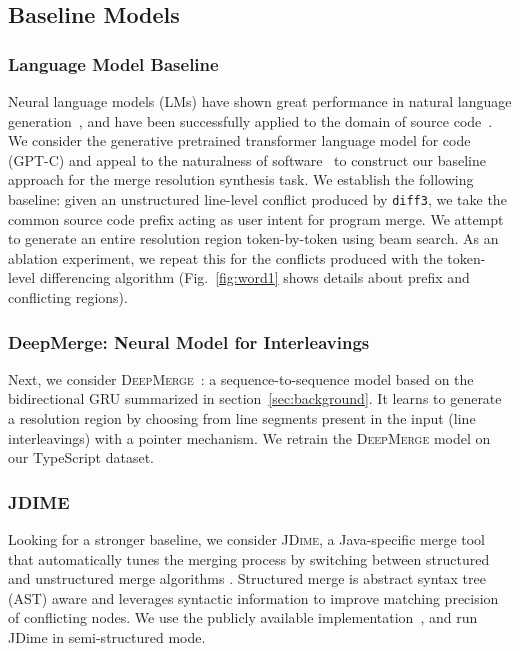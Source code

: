 \subsection{Baseline Models}
\label{sec:baselines}

\subsubsection{Language Model Baseline}

Neural language models (LMs) have shown great performance in natural language generation~\citep{gpt2, sellam-etal-2020-bleurt}, and have been successfully applied to the domain of source code~\citep{10.5555/2337223.2337322, gptc, feng-etal-2020-codebert}. We consider the generative pretrained transformer language model for code (GPT-C) and appeal to the naturalness of software~\citep{naturalness} to construct our baseline approach for the merge resolution synthesis task. We establish the following baseline:
given an unstructured line-level conflict produced by \texttt{diff3}, we take the common source code prefix acting as user intent for program merge. We attempt to generate an entire resolution region token-by-token using beam search. As an ablation experiment, we repeat this for the conflicts produced with the token-level differencing algorithm (Fig.~\ref{fig:word1} shows details about prefix and conflicting regions).

\subsubsection{DeepMerge: Neural Model for Interleavings}

Next, we consider \textsc{DeepMerge}~\citep{Dinella2021}: a sequence-to-sequence model based on the bidirectional GRU summarized in section~\ref{sec:background}. It learns to generate a resolution region by choosing from line segments present in the input (line interleavings) with a pointer mechanism. We retrain the \textsc{DeepMerge} model on our TypeScript dataset.

\subsubsection{JDIME}
Looking for a stronger baseline, we consider \textsc{JDime}, a Java-specific merge tool that automatically tunes the merging process by switching between structured and unstructured merge algorithms \citep{apel2012structured}. Structured merge is abstract syntax tree (AST) aware and leverages syntactic information to improve matching precision of conflicting nodes.  We use the publicly available implementation~\citep{jdime}, and run JDime in semi-structured mode. 

